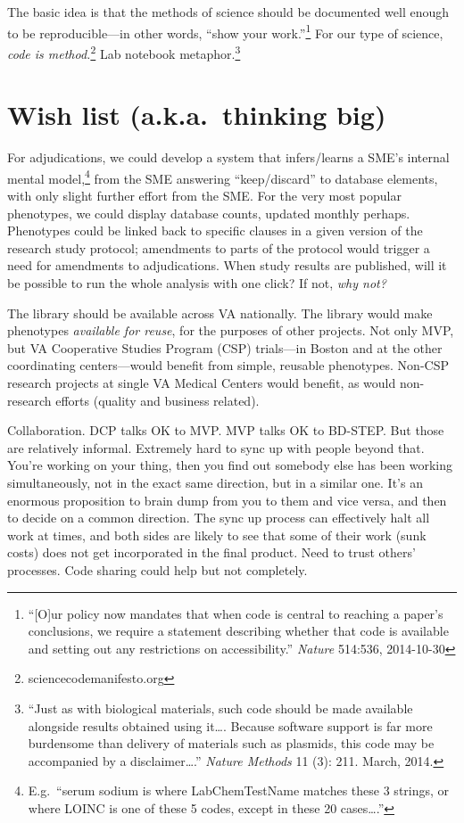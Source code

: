\documentclass{tufte-handout}
\begin{document}
\newpage

The basic idea is that the methods of science should be documented
well enough to be reproducible---in other words, ``show your
work.''\footnote{``[O]ur policy now mandates that when code is central
  to reaching a paper's conclusions, we require a statement describing
  whether that code is available and setting out any restrictions on
  accessibility.'' \emph{Nature} 514:536, 2014-10-30} For our type of
science, \emph{code is method.}\footnote{sciencecodemanifesto.org} Lab
notebook metaphor.\footnote{``Just as with biological materials, such
  code should be made available alongside results obtained using
  it\ldots{}. Because software support is far more burdensome than
  delivery of materials such as plasmids, this code may be accompanied
  by a disclaimer\ldots{}.'' \emph{Nature Methods} 11 (3): 211. March,
  2014.} %

\section{Wish list (a.k.a.\ thinking big)}

For adjudications, we could develop a system that infers\slash learns
a SME's internal mental model,\footnote{E.g.\ ``serum sodium is where
  LabChemTestName matches these 3 strings, or where LOINC is one of
  these 5 codes, except in these 20 cases\ldots{}.''} from the SME
answering ``keep\slash discard'' to database elements, with only
slight further effort from the SME. For the very most popular
phenotypes, we could display database counts, updated monthly perhaps.
Phenotypes could be linked back to specific clauses in a given version
of the research study protocol; amendments to parts of the protocol
would trigger a need for amendments to adjudications. When study
results are published, will it be possible to run the whole analysis
with one click? If not, \emph{why not?}

The library should be available across VA nationally. The library
would make phenotypes \emph{available for reuse}, for the purposes of
other projects. Not only MVP, but VA Cooperative Studies Program (CSP)
trials---in Boston and at the other coordinating centers---would
benefit from simple, reusable phenotypes. Non-CSP research projects at
single VA Medical Centers would benefit, as would non-research efforts
(quality and business related).

Collaboration. DCP talks OK to MVP. MVP talks OK to BD-STEP. But those
are relatively informal. Extremely hard to sync up with people beyond
that. You're working on your thing, then you find out somebody else
has been working simultaneously, not in the exact same direction, but
in a similar one. It's an enormous proposition to brain dump from you
to them and vice versa, and then to decide on a common direction. The
sync up process can effectively halt all work at times, and both sides
are likely to see that some of their work (sunk costs) does not get
incorporated in the final product. Need to trust others' processes.
Code sharing could help but not completely.
\end{document}
